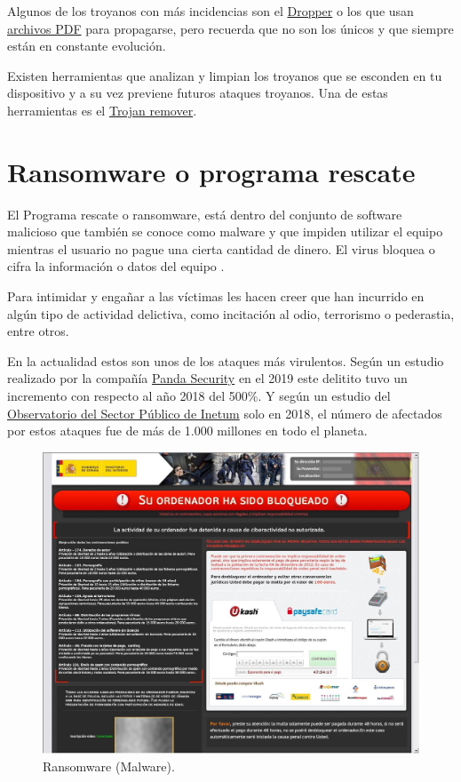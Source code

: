 \documentclass[
  a4paper,
  openany]{book}
\begin{document}
Algunos de los troyanos con más incidencias son el \href{https://www.welivesecurity.com/la-es/2021/12/29/que-es-dropper-cual-es-funcion-esta-amenaza/}{Dropper} o los que usan \href{https://blogs.protegerse.com/2023/04/20/cuidado-con-las-falsas-facturas-varias-familias-de-troyanos-usan-archivos-pdf-para-propagarse/}{archivos PDF} para propagarse, pero recuerda que no son los únicos y que siempre están en constante evolución.

Existen herramientas que analizan y limpian los troyanos que se esconden en tu dispositivo y a su vez previene futuros ataques troyanos. Una de estas herramientas es el \href{https://www.avast.com/c-trojan-remover-tool}{Trojan remover}.

\hypertarget{ransomware-o-programa-rescate}{%
\section{Ransomware o programa rescate}\label{ransomware-o-programa-rescate}}

El Programa rescate o ransomware, está dentro del conjunto de software malicioso que también se conoce como malware y que impiden utilizar el equipo mientras el usuario no pague una cierta cantidad de dinero. El virus bloquea o cifra la información o datos del equipo \citep{WIKI-ransomware}.

Para intimidar y engañar a las víctimas les hacen creer que han incurrido en algún tipo de actividad delictiva, como incitación al odio, terrorismo o pederastia, entre otros.

En la actualidad estos son unos de los ataques más virulentos. Según un estudio realizado por la compañía \href{https://www.pandasecurity.com/es/mediacenter/seguridad/2019-tsunami-del-ransomware/}{Panda Security} en el 2019 este delitito tuvo un incremento con respecto al año 2018 del 500\%. Y según un estudio del \href{https://www.ospi.es/es/}{Observatorio del Sector Público de Inetum} solo en 2018, el número de afectados por estos ataques fue de más de 1.000 millones en todo el planeta.

\begin{figure}

{\centering \includegraphics[width=0.75\linewidth]{images/ransomware} 

}

\caption{Ransomware (Malware).}\label{fig:unnamed-chunk-15}
\end{figure}
\end{document}
